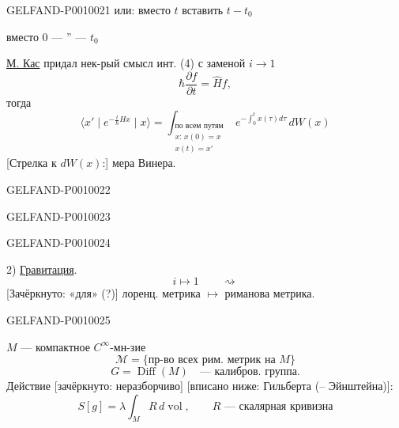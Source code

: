 \begin{GelfandAdjacentEvidence}{GELFAND-P001002}{1}
или: вместо $t$ вставить $t-t_0$

\hspace{2em}вместо $0$ --- '' --- $t_0$

\underline{М. Кас} придал нек-рый смысл инт. (4) с заменой $i\to1$
\begin{equation*}
\hbar\frac{\partial f}{\partial t}=\widehat H f,
\tag{6}
\end{equation*}
тогда
\begin{equation*}
\langle x'\mid e^{-\frac{t}{\hbar}Hx}\mid x\rangle
=\int_{\substack{\text{по всем путям}\\x:\,x(0)=x\\x(t)=x'}}
e^{-\int_0^t x(\tau)d\tau}\,dW(x)
\tag{7}
\end{equation*}
[Стрелка к $dW(x)$:] мера Винера.
\end{GelfandAdjacentEvidence}
\begin{GelfandAdjacentEvidence}{GELFAND-P001002}{2}

\end{GelfandAdjacentEvidence}
\begin{GelfandAdjacentEvidence}{GELFAND-P001002}{3}

\end{GelfandAdjacentEvidence}
\begin{GelfandAdjacentEvidence}{GELFAND-P001002}{4}


2) \underline{Гравитация}.
\[
i\mapsto1\qquad\rightsquigarrow
\]
[Зачёркнуто: «для» (?)] лоренц. метрика $\longmapsto$ риманова метрика.
\end{GelfandAdjacentEvidence}
\begin{GelfandAdjacentEvidence}{GELFAND-P001002}{5}


$M$ --- компактное $C^\infty$-мн-зие
\[
\mathcal M=\{\text{пр-во всех рим. метрик на }M\}
\]
\[
G=\operatorname{Diff}(M)\quad\text{--- калибров. группа.}
\]
Действие [зачёркнуто: неразборчиво] [вписано ниже: Гильберта (-- Эйнштейна)]:
\begin{equation*}
S[g]=\lambda\int_M R\,d\operatorname{vol},\qquad
R\text{ --- скалярная кривизна}
\tag{8}
\end{equation*}
\end{GelfandAdjacentEvidence}

